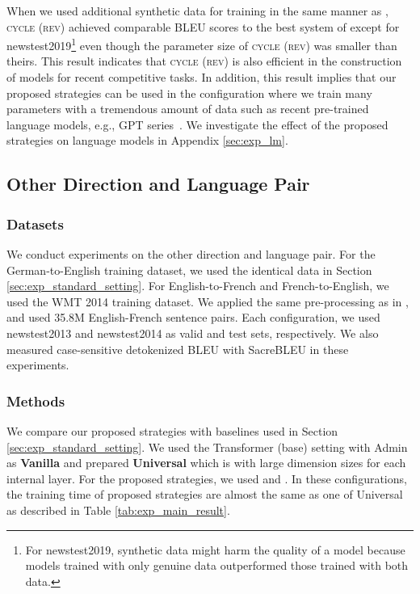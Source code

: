 \documentclass[11pt]{article}
\begin{document}
When we used additional synthetic data for training in the same manner as \cite{kiyono-etal-2020-tohoku}, \textsc{cycle (rev)} achieved comparable BLEU scores to the best system of \cite{kiyono-etal-2020-tohoku} except for newstest2019\footnote{For newstest2019, synthetic data might harm the quality of a model because models trained with only genuine data outperformed those trained with both data.} even though the parameter size of \textsc{cycle (rev)} was smaller than theirs.
This result indicates that \textsc{cycle (rev)} is also efficient in the construction of models for recent competitive tasks.
In addition, this result implies that our proposed strategies can be used in the configuration where we train many parameters with a tremendous amount of data such as recent pre-trained language models, e.g., GPT series~\cite{NEURIPS2020_1457c0d6}.
We investigate the effect of the proposed strategies on language models in Appendix \ref{sec:exp_lm}.

\subsection{Other Direction and Language Pair}
\label{sec:exp_other_configurations}

\subsubsection{Datasets}
We conduct experiments on the other direction and language pair.
For the German-to-English training dataset, we used the identical data in Section \ref{sec:exp_standard_setting}.
For English-to-French and French-to-English, we used the WMT 2014 training dataset.
We applied the same pre-processing as in \cite{ott-etal-2018-scaling}, and used 35.8M English-French sentence pairs.
Each configuration, we used newstest2013 and newstest2014 as valid and test sets, respectively.
We also measured case-sensitive detokenized BLEU with SacreBLEU in these experiments.

\subsubsection{Methods}
We compare our proposed strategies with baselines used in Section \ref{sec:exp_standard_setting}.
We used the Transformer (base) setting with Admin as \textbf{Vanilla} and prepared \textbf{Universal} which is  with large dimension sizes for each internal layer.
For the proposed strategies, we used  and .
In these configurations, the training time of proposed strategies are almost the same as one of Universal as described in Table \ref{tab:exp_main_result}.
\end{document}
